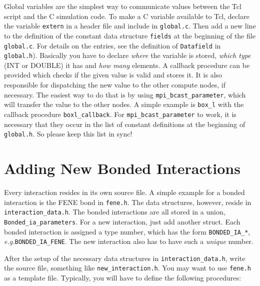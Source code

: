 \documentclass[
a4paper,                        %
11pt,                           %
twoside,                        %
footsepline,                    %
headsepline,                    %
headexclude,                    %
footexclude,                    %
pagesize,                       %
bibtotocnumbered,               %
idxtotoc                        %
]{scrreprt}
\newcommand{\eg}{\textit{e.g.}\xspace}
\begin{document}
Global variables are the simplest way to communicate values between
the Tcl script and the C simulation code.  To make a C variable
available to Tcl, declare the variable \texttt{extern} in a header
file and include in \texttt{global.c}. Then add a new line to the
definition of the constant data structure \texttt{fields} at the
beginning of the file \texttt{global.c}. For details on the entries,
see the definition of \texttt{Datafield} in
\texttt{global.h}). Basically you have to declare \emph{where} the
variable is stored, \emph{which type} (INT or DOUBLE) it has and
\emph{how many} elements. A callback procedure can be provided which
checks if the given value is valid and stores it. It is also
responsible for dispatching the new value to the other compute nodes,
if necessary. The easiest way to do that is by using
\verb!mpi_bcast_parameter!, which will transfer the value to the other
nodes. A simple example is \verb!box_l! with the callback procedure
\verb!boxl_callback!. For \verb!mpi_bcast_parameter! to work, it is
necessary that they occur in the list of constant definitions at the
beginning of \texttt{global.h}.  So please keep this list in sync!

\section{Adding New Bonded Interactions}

Every interaction resides in its own source file. A simple example for
a bonded interaction is the FENE bond in \texttt{fene.h}. The data
structures, however, reside in \texttt{interaction\_data.h}.  The
bonded interactions are all stored in a union,
\verb!Bonded_ia_parameters!. For a new interaction, just add another
struct. Each bonded interaction is assigned a type number, which has
the form \verb!BONDED_IA_*!, \eg \verb!BONDED_IA_FENE!. The new
interaction also has to have such a \emph{unique} number.
	
After the setup of the necessary data structures in
\verb!interaction_data.h!, write the source file, something like
\verb!new_interaction.h!. You may want to use \verb!fene.h! as a
template file.  Typically, you will have to define the following
procedures:
\end{document}
